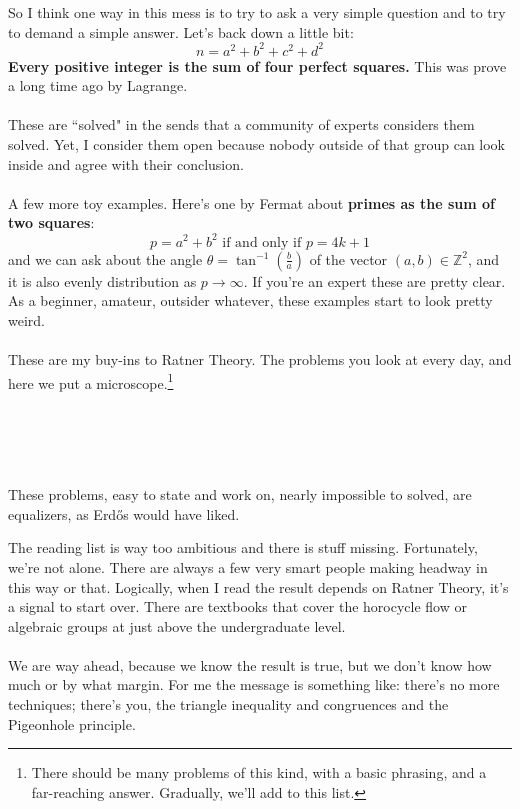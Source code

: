 \documentclass[12pt]{article}
\begin{document}
\newpage

\noindent So I think one way in this mess is to try to ask a very simple question and to try to demand a simple answer.  Let's back down a little bit:
$$ n = a^2 + b^2 + c^2 + d^2 $$
\textbf{Every positive integer is the sum of four perfect squares.} This was prove a long time ago by Lagrange.  \\ \\
These are ``solved" in the sends that a community of experts considers them solved.  Yet, I consider them open because nobody outside of that group can look inside and agree with their conclusion. \\ \\
A few more toy examples.  Here's one by Fermat about \textbf{primes as the sum of two squares}:
$$ p = a^2 + b^2 \text{ if and only if } p = 4k+1 $$
and we can ask about the angle $\theta = \tan^{-1}(\frac{b}{a})$ of the vector $(a,b) \in \mathbb{Z}^2$, and it is also evenly distribution as $p \to \infty$. If you're an expert these are pretty clear.  As a beginner, amateur, outsider whatever, these examples start to look pretty weird. \\ \\
These are my buy-ins to Ratner Theory.  The problems you look at every day, and here we put a microscope.\footnote{There should be many problems of this kind, with a basic phrasing, and a far-reaching answer.  Gradually, we'll add to this list.} \\\\\\
 \\ \\


\noindent These problems, easy to state and work on, nearly impossible to solved, are equalizers, as Erd\H{o}s would have liked. \\

\selectfont \fontsize{8}{10}\selectfont

\noindent The reading list is way too ambitious and there is stuff missing.  Fortunately, we're not alone.  There are always a few very smart people making headway in this way or that.  Logically, when I read the result depends on Ratner Theory, it's a signal to start over. 
There are textbooks that cover the horocycle flow or algebraic groups at just above the undergraduate level.   \\ \\
We are way ahead, because we know the result is true, but we don't know how much or by what margin.  For me the message is something like: there's no more techniques; there's you, the triangle inequality and congruences and the Pigeonhole principle.
\end{document}
